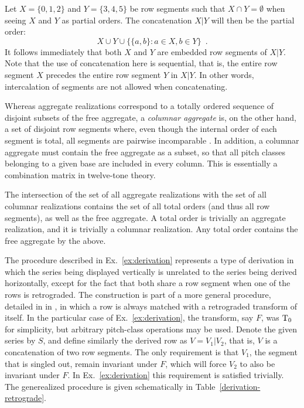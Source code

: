 \begin{example}
    \cite[200]{Starr1984}
    Let $X = \{ 0, 1, 2 \}$ and $Y = \{ 3, 4, 5 \}$ be row segments such that $X \cap Y = \emptyset$ when seeing $X$ and $Y$ as partial orders. The concatenation $X | Y$ will then be the partial order:
    \begin{equation}
        X \cup Y \cup \{ \{ a, b \} : a \in X, b \in Y \} \enspace.
    \end{equation}
    It follows immediately that both $X$ and $Y$ are embedded row segments of $X | Y$. Note that the use of concatenation here is sequential, that is, the entire row segment $X$ precedes the entire row segment $Y$ in $X | Y$. In other words, intercalation of segments are not allowed when concatenating.
\end{example}

Whereas aggregate realizations correspond to a totally ordered sequence of disjoint subsets of the free aggregate, a \emph{columnar aggregate} is, on the other hand, a set of disjoint row segments where, even though the internal order of each segment is total, all segments are pairwise incomparable \cite[201]{Starr1984}. In addition, a columnar aggregate must contain the free aggregate as a subset, so that all pitch classes belonging to a given base are included in every column. This is essentially a combination matrix in twelve-tone theory.

\begin{example}
    \cite[201, 210]{Starr1984}
    The intersection of the set of all aggregate realizations with the set of all columnar realizations contains the set of all total orders (and thus all row segments), as well as the free aggregate. A total order is trivially an aggregate realization, and it is trivially a columnar realization. Any total order contains the free aggregate by the above.
\end{example}

The procedure described in Ex.~\ref{ex:derivation} represents a type of derivation in which the series being displayed vertically is unrelated to the series being derived horizontally, except for the fact that both share a row segment when one of the rows is retrograded. The construction is part of a more general procedure, detailed in in \cite[211]{Starr1984}, in which a row is always matched with a retrograded transform of itself. In the particular case of Ex.~\ref{ex:derivation}, the transform, say $F$, was $\operatorname{T}_0$ for simplicity, but arbitrary pitch-class operations may be used. Denote the given series by $S$, and define similarly the derived row as $V = V_1 | V_2$, that is, $V$ is a concatenation of two row segments. The only requirement is that $V_1$, the segment that is singled out, remain invariant under $F$, which will force $V_2$ to also be invariant under $F$. In Ex.~\ref{ex:derivation} this requirement is satisfied trivially. The generealized procedure is given schematically in Table~\ref{derivation-retrograde}.


